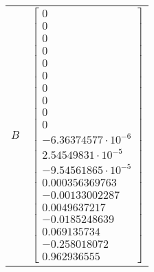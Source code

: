 \begin{tabular}{cl}
   $B$    & $\left[\begin{matrix}0\\0\\0\\0\\0\\0\\0\\0\\0\\0\\-6.36374577 \cdot 10^{-6}\\2.54549831 \cdot 10^{-5}\\-9.54561865 \cdot 10^{-5}\\0.000356369763\\-0.00133002287\\0.0049637217\\-0.0185248639\\0.069135734\\-0.258018072\\0.962936555\end{matrix}\right]$                                                                                                                                                                                                                                                                                                                                                                                                                                                                                                                                                                                                                                                                                                                                                                                                                                                                                                                                                                                                                                                                                                                                                                                                                                                                                                                                                                                                                                                                                                                                                                                                                                                                                                                                                                                                                                                                                                                                                                                                                                                                                                                                                                                                                                                                               
\end{tabular}
